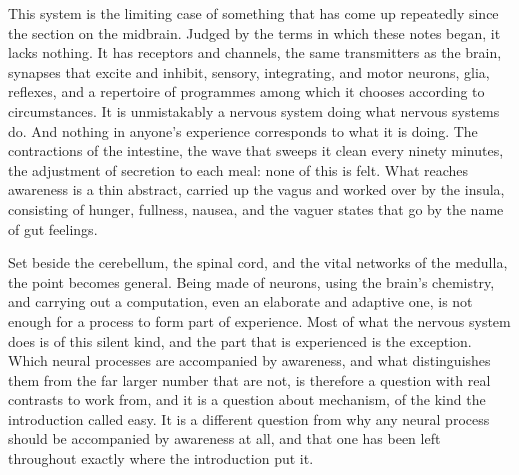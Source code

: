 \documentclass[11pt]{article}
\begin{document}
This system is the limiting case of something that has come up repeatedly since the section on the midbrain. Judged by the terms in which these notes began, it lacks nothing. It has receptors and channels, the same transmitters as the brain, synapses that excite and inhibit, sensory, integrating, and motor neurons, glia, reflexes, and a repertoire of programmes among which it chooses according to circumstances. It is unmistakably a nervous system doing what nervous systems do. And nothing in anyone's experience corresponds to what it is doing. The contractions of the intestine, the wave that sweeps it clean every ninety minutes, the adjustment of secretion to each meal: none of this is felt. What reaches awareness is a thin abstract, carried up the vagus and worked over by the insula, consisting of hunger, fullness, nausea, and the vaguer states that go by the name of gut feelings.

Set beside the cerebellum, the spinal cord, and the vital networks of the medulla, the point becomes general. Being made of neurons, using the brain's chemistry, and carrying out a computation, even an elaborate and adaptive one, is not enough for a process to form part of experience. Most of what the nervous system does is of this silent kind, and the part that is experienced is the exception. Which neural processes are accompanied by awareness, and what distinguishes them from the far larger number that are not, is therefore a question with real contrasts to work from, and it is a question about mechanism, of the kind the introduction called easy. It is a different question from why any neural process should be accompanied by awareness at all, and that one has been left throughout exactly where the introduction put it.
\end{document}
